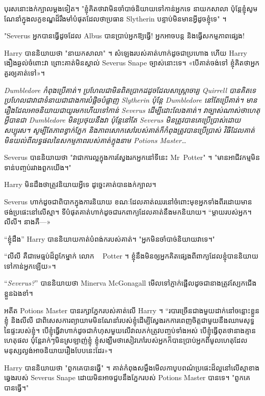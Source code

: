 បុរស​នោះ​ងក់​ក្បាល​ម្ដង​ទៀត។ "ខ្ញុំគិតថាវាមិនចាំបាច់និយាយទៅកាន់អ្នកទេ នាយកសាលា ប៉ុន្តែខ្ញុំសូមណែនាំក្នុងលក្ខខណ្ឌដ៏រឹងមាំបំផុតដែលថាប្រធាន Slytherin បន្ទាប់មិនមានអ្វីដូចខ្ញុំទេ" ។

"Severus អ្នកបានធ្វើដូចដែល Albus បានប្រាប់អ្នកឱ្យធ្វើ! អ្នកអាចបន្ត និងធ្វើសកម្មភាពផ្សេង!

Harry បាននិយាយថា "នាយកសាលា" ។ សំឡេងរបស់គាត់ហាក់ដូចជាប្រហោង ហើយ Harry ងឿងឆ្ងល់ចំពោះវា ព្រោះគាត់មិនស្គាល់ Severus Snape ច្បាស់នោះទេ។ «​បើ​គាត់​ចង់​ទៅ ខ្ញុំ​គិត​ថា​អ្នក​គួរ​ឲ្យ​គាត់​ទៅ»។

\emph{ Dumbledore កំពុងប្រើគាត់។ ប្រហែលជាមិនពិតប្រាកដដូចដែលសាស្រ្តាចារ្យ Quirrell បានគិតទេ ប្រហែលជាវាជាទំនាយជាជាងការបំផ្លិចបំផ្លាញ Slytherin ប៉ុន្តែ Dumbledore នៅតែប្រើគាត់។ មាន​រឿង​ដែល​អាច​និយាយ​ជា​យូរ​មក​ហើយ​ទៅ​កាន់ Severus ដើម្បី​ដោះលែង​គាត់។ វាច្បាស់ណាស់ថាហេតុអ្វីបានជា Dumbledore មិនប្រថុយនឹងវា ប៉ុន្តែនៅតែ Severus មិនត្រូវបានគេប្រើប្រាស់ដោយសប្បុរស។ សូម្បីតែភាពខ្វាក់ភ្នែក និងភាពសោកសៅរបស់គាត់ក៏កំពុងត្រូវបានប្រើប្រាស់ វិធីដែលគាត់មិនយល់ពីលទ្ធផលនៃសកម្មភាពរបស់គាត់ក្នុងនាម Potions Master…}

Severus បាននិយាយថា "វាជាការល្អក្នុងការស្វែងរកអ្នកនៅទីនេះ Mr~Potter" ។ "មានអាជីវកម្មមិនទាន់បញ្ចប់រវាងពួកយើង។"

Harry មិនដឹងថាត្រូវនិយាយអ្វីទេ ដូច្នេះគាត់បានងក់ក្បាល។

Severus ហាក់​ដូចជា​ពិបាក​ក្នុង​ការ​និយាយ ខណៈ​ដែល​គាត់​ឈរ​នៅ​ចំពោះ​មុខ​អ្នក​ទាំង​ពីរ​ដោយ​មាន​ថង់​ប្រផេះ​នៅ​លើ​ស្មា។ ទីបំផុតគាត់ហាក់ដូចជារកពាក្យដែលគាត់នឹងមកនិយាយ។ “ម្តាយរបស់អ្នក។ លីលី។ នាង​គឺ—»

“ខ្ញុំដឹង” Harry បាននិយាយកាត់បំពង់ករបស់គាត់។ "អ្នកមិនចាំបាច់និយាយវាទេ។"

“លីលី គឺជាមេធ្មប់ដ៏ពូកែម្នាក់ លោក ~ Potter ។ ខ្ញុំ​នឹង​មិន​ឲ្យ​អ្នក​គិត​ផ្សេង​ពី​ពាក្យ​ដែល​ខ្ញុំ​បាន​និយាយ​ទៅ​កាន់​អ្នក​ឡើយ»។

“\emph{Severus?}” បាននិយាយថា Minerva McGonagall មើលទៅភ្ញាក់ផ្អើលដូចជានាងត្រូវស្បែកជើងខ្លួនឯងខាំ។

អតីត Potions Master បានរក្សាភ្នែករបស់គាត់លើ Harry ។ “របារច្រើនជាងមួយដាក់នៅចន្លោះខ្លួនខ្ញុំ និងលីលី ជាពិសេសការព្យាយាមមិនណែនាំរបស់ខ្ញុំដើម្បីស្វែងរកការពេញចិត្តជាមួយនឹងឈាមសុទ្ធនៃផ្ទះរបស់ខ្ញុំ។ បើ​ខ្ញុំ​ធ្វើ​វា​ហាក់​ដូច​ជា​កំហុស​មួយ​លើ​វាល​ភក់​ត្រូវ​បញ្ចប់​ទាំង​អស់ បើ​ខ្ញុំ​ធ្វើ​ពុត​ថា​នាង​គ្មាន​ហេតុផល ប៉ុន្តែ​រាក់​ៗ​មិន​ស្រឡាញ់​ខ្ញុំ ខ្ញុំ​សង្ឃឹម​ថា​សៀវភៅ​របស់​អ្នក​ក៏​បាន​ប្រាប់​អ្នក​ពី​មូលហេតុ​ដែល​មនុស្ស​ល្ងង់​អាច​និយាយ​រឿង​បែប​នេះ​ដែរ»។

Harry បាននិយាយថា "ពួកគេបានធ្វើ" ។ គាត់កំពុងសម្លឹងមើលកាបូបពណ៌ប្រផេះដ៏ល្អនៅលើស្មាខាងឆ្វេងរបស់ Severus Snape ដោយមិនអាចជួបនឹងភ្នែករបស់ Potions Master បានទេ។ "ពួកគេបានធ្វើ។"

